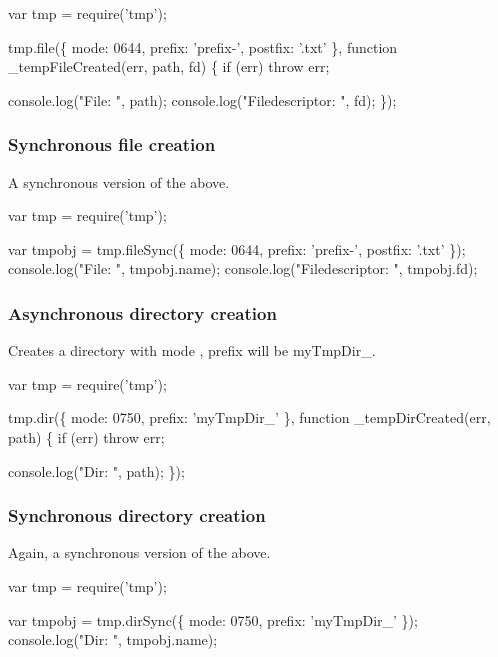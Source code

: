 \begin{DoxyCode}
var tmp = require('tmp');

tmp.file(\{ mode: 0644, prefix: 'prefix-', postfix: '.txt' \}, function \_tempFileCreated(err, path, fd) \{
  if (err) throw err;

  console.log("File: ", path);
  console.log("Filedescriptor: ", fd);
\});
\end{DoxyCode}


\subsubsection*{Synchronous file creation}

A synchronous version of the above.


\begin{DoxyCode}
var tmp = require('tmp');

var tmpobj = tmp.fileSync(\{ mode: 0644, prefix: 'prefix-', postfix: '.txt' \});
console.log("File: ", tmpobj.name);
console.log("Filedescriptor: ", tmpobj.fd);
\end{DoxyCode}


\subsubsection*{Asynchronous directory creation}

Creates a directory with mode {}, prefix will be {\ttfamily my\+Tmp\+Dir\+\_\+}.


\begin{DoxyCode}
var tmp = require('tmp');

tmp.dir(\{ mode: 0750, prefix: 'myTmpDir\_' \}, function \_tempDirCreated(err, path) \{
  if (err) throw err;

  console.log("Dir: ", path);
\});
\end{DoxyCode}


\subsubsection*{Synchronous directory creation}

Again, a synchronous version of the above.


\begin{DoxyCode}
var tmp = require('tmp');

var tmpobj = tmp.dirSync(\{ mode: 0750, prefix: 'myTmpDir\_' \});
console.log("Dir: ", tmpobj.name);
\end{DoxyCode}


